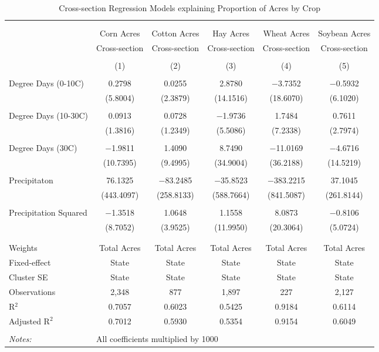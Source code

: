 \documentclass[10pt]{article}
\begin{document}
\begin{table}[!htbp] \centering 
  \caption{Cross-section Regression Models explaining Proportion of Acres by Crop} 
  \label{} 
\footnotesize 
\begin{tabular}{@{\extracolsep{5pt}}lccccc} 
\\[-1.8ex]\hline 
\hline \\[-1.8ex] 
\\[-1.8ex] & Corn Acres & Cotton Acres & Hay Acres & Wheat Acres & Soybean Acres \\ 
 & Cross-section & Cross-section & Cross-section & Cross-section & Cross-section \\ 
\\[-1.8ex] & (1) & (2) & (3) & (4) & (5)\\ 
\hline \\[-1.8ex] 
 Degree Days (0-10C) & 0.2798 & 0.0255 & 2.8780 & $-$3.7352 & $-$0.5932 \\ 
  & (5.8004) & (2.3879) & (14.1516) & (18.6070) & (6.1020) \\ 
  & & & & & \\ 
 Degree Days (10-30C) & 0.0913 & 0.0728 & $-$1.9736 & 1.7484 & 0.7611 \\ 
  & (1.3816) & (1.2349) & (5.5086) & (7.2338) & (2.7974) \\ 
  & & & & & \\ 
 Degree Days (30C) & $-$1.9811 & 1.4090 & 8.7490 & $-$11.0169 & $-$4.6716 \\ 
  & (10.7395) & (9.4995) & (34.9004) & (36.2188) & (14.5219) \\ 
  & & & & & \\ 
 Precipitaton & 76.1325 & $-$83.2485 & $-$35.8523 & $-$383.2215 & 37.1045 \\ 
  & (443.4097) & (258.8133) & (588.7664) & (841.5087) & (261.8144) \\ 
  & & & & & \\ 
 Precipitation Squared & $-$1.3518 & 1.0648 & 1.1558 & 8.0873 & $-$0.8106 \\ 
  & (8.7052) & (3.9525) & (11.9950) & (20.3064) & (5.0724) \\ 
  & & & & & \\ 
\hline \\[-1.8ex] 
Weights & Total Acres & Total Acres & Total Acres & Total Acres & Total Acres \\ 
Fixed-effect & State & State & State & State & State \\ 
Cluster SE & State & State & State & State & State \\ 
Observations & 2,348 & 877 & 1,897 & 227 & 2,127 \\ 
R$^{2}$ & 0.7057 & 0.6023 & 0.5425 & 0.9184 & 0.6114 \\ 
Adjusted R$^{2}$ & 0.7012 & 0.5930 & 0.5354 & 0.9154 & 0.6049 \\ 
\hline 
\hline \\[-1.8ex] 
\textit{Notes:} & \multicolumn{5}{l}{All coefficients multiplied by 1000} \\ 
\end{tabular} 
\end{table} 
\end{document}
